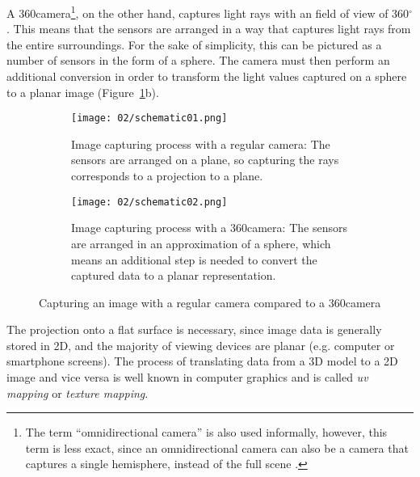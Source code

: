 A 360\degree camera\footnote{The term ``omnidirectional camera'' is also used informally, however, this term is less exact, since an omnidirectional camera can also be a camera that captures a single hemisphere, instead of the full scene \cite{omnidir}.}, on the other hand, captures light rays with an field of view of 360$^{\circ}$. This means that the sensors are arranged in a way that captures light rays from the entire surroundings. For the sake of simplicity, this can be pictured as a number of sensors in the form of a sphere\footnotemark. The camera must then perform an additional conversion in order to transform the light values captured on a sphere to a planar image (Figure~\ref{fig:cameras}b). \cite{omnidir}


\begin{figure}
\centering
    \begin{subfigure}[t]{0.9\textwidth}            
            \centering
            \texttt{[image: 02/schematic01.png]}
            \caption{Image capturing process with a regular camera: The sensors are arranged on a plane, so capturing the rays corresponds to a projection to a plane.}
    \end{subfigure}
    \begin{subfigure}[t]{0.9\textwidth}
            \centering
            \texttt{[image: 02/schematic02.png]}
            \caption{Image capturing process with a 360\degree camera: The sensors are arranged in an approximation of a sphere, which means an additional step is needed to convert the captured data to a planar representation.}
    \end{subfigure}
    \caption{Capturing an image with a regular camera compared to a 360\degree camera}\label{fig:cameras}
\end{figure}

The projection onto a flat surface is necessary, since image data is generally stored in 2D, and the majority of viewing devices are planar (e.g. computer or smartphone screens). The process of translating data from a 3D model to a 2D image and vice versa is well known in computer graphics and is called \emph{uv mapping} or \emph{texture mapping}.

